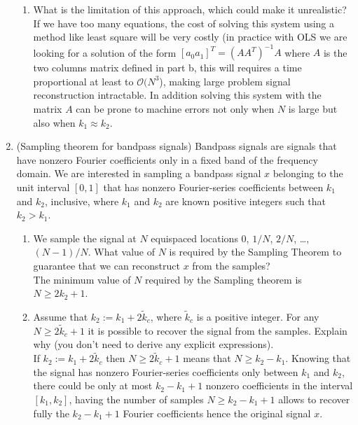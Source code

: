 \documentclass[12pt,twoside]{article}
\begin{document}
\begin{enumerate}
\begin{enumerate}
  \item What is the limitation of this approach, which could make it unrealistic?\\
  If we have too many equations, the cost of solving this system using a method like least square will be very costly (in practice with OLS we are looking for a solution of the form $[a_0 a_1]^T = (A A^T )^{-1} A$ where $A$ is the two columns matrix defined in
  part b, this will requires a time proportional at least to $\mathcal{O}(N^3$), making large problem signal reconstruction intractable. In addition solving this system with the matrix $A$ can be prone to machine errors 
  not only when $N$ is large but also when $k_1 \approx k_2$.
  
\end{enumerate}
   
\newpage
   
\item (Sampling theorem for bandpass signals) Bandpass signals are signals that have nonzero Fourier coefficients
only in a fixed band of the frequency domain. We are interested in
sampling a bandpass signal $x$ belonging to the unit interval $[0,1]$
that has nonzero Fourier-series coefficients between $k_1$ and $k_2$,
inclusive, where $k_1$ and $k_2$ are known positive integers such that $k_2 > k_1$. 
\begin{enumerate}
\item We sample the signal at $N$ equispaced locations $0$, $1/N$, $2/N$, \ldots, $(N-1)/N$. What value of $N$ is required by the Sampling Theorem to guarantee that we can reconstruct $x$ from the samples?\\
The minimum value of $N$ required by the Sampling theorem is $N \ge 2 k_2 + 1$.

\item Assume that $k_2:=k_1 + 2\tilde{k}_c$, where $\tilde{k}_c $ is a positive integer. For any $N \geq 2\tilde{k}_c + 1$ it is possible to recover the signal from the samples. Explain why (you don't need to derive any explicit expressions).\\
If  $k_2:=k_1 + 2\tilde{k}_c$ then $N \geq 2\tilde{k}_c + 1$ means that $N \geq k_2 - k_1$. Knowing that the signal has nonzero Fourier-series coefficients only between $k_1$ and $k_2$, there could be only at most $k_2 - k_1 + 1$ nonzero
coefficients in the interval $[k_1, k_2]$, having the number of samples $N \ge k_2 - k_1 + 1$ allows to recover fully the $k_2 - k_1 + 1$ Fourier coefficients hence the original signal $x$.


\end{enumerate}
\end{enumerate}
\end{document}

